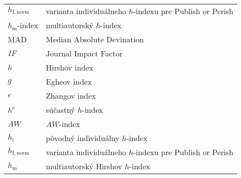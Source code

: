 \begin{flushleft}
\begin{longtable}[l]{ll}
    $h_{\mathrm{I, norm}}$ & varianta individuálneho $h$-indexu pre Publish or Perish\\[1mm]
    $h_{\mathrm{m}}$-index & multiautorský $h$-index \\[1em]
    MAD                    & Median Absolute Devination \\[1.5mm]
    $\mathit{IF}$          & Journal Impact Factor \\[1mm]
    $h$                    & Hirshov index \\[1mm]
    $g$                    & Egheov index \\[1mm]
    $e$                    & Zhangov index \\[1mm]
    $h^{\mathrm{c}}$       & súčastný $h$-index \\[1mm]
    $\mathit{AW}$          & $\mathit{AW}$-index \\[1mm]
    $h_{\mathrm{i}}$       & pôvodný individuálny $h$-index  \\[1mm]
    $h_{\mathrm{I, norm}}$ & varianta individuálneho $h$-indexu pre Publish or Perish\\[1mm]
    $h_{\mathrm{m}}$       & multiautorský Hirshov $h$-index  \\[1mm]
  \end{longtable}
\end{flushleft}

